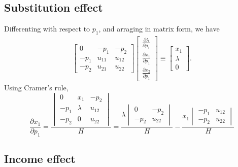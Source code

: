 \subsection*{Substitution effect}

Differenting with respect to $p_1$, and arraging in matrix form, we have
\begin{align*}
    \begin{bmatrix}
        0 & -p_1 &-p_2 \\
        -p_1 & u_{11} & u_{12} \\
        -p_2 & u_{21} & u_{22}
    \end{bmatrix}
    \begin{bmatrix}
        \frac{\partial \lambda}{\partial p_1} \\
        \frac{\partial x_1}{\partial p_1}\\
        \frac{\partial x_2}{\partial p_1}
    \end{bmatrix}
    \equiv
    \begin{bmatrix}
        x_1 \\
        \lambda \\
        0
    \end{bmatrix}.
\end{align*}
Using Cramer's rule, 
\[
    \frac{\partial x_1}{\partial p_1} = 
    \frac{
    \begin{vmatrix}
    0 & x_1 &-p_2 \\
    -p_1 & \lambda & u_{12} \\
    -p_2 &0 & u_{22}
    \end{vmatrix}
    }{H}
    =
    \frac{\lambda
    \begin{vmatrix}
    0 & -p_2 \\
    -p_2 & u_{22}
    \end{vmatrix}
    }{H}
    -
    \frac{x_1
    \begin{vmatrix}
    -p_1 & u_{12} \\
    -p_2 & u_{22}
    \end{vmatrix}
    }{H}
\]
\subsection*{Income effect}

